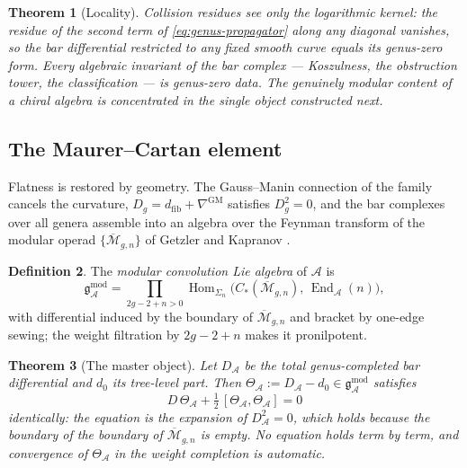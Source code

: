 \documentclass[11pt]{amsart}
\numberwithin{equation}{section}
\theoremstyle{plain}
\newtheorem{theorem}{Theorem}[section]
\theoremstyle{definition}
\newtheorem{definition}[theorem]{Definition}
\theoremstyle{remark}
\newcommand{\cA}{\mathcal{A}}
\newcommand{\cM}{\mathcal{M}}
\newcommand{\gmod}{\mathfrak{g}^{\mathrm{mod}}}
\newcommand{\Dfib}{d_{\mathrm{fib}}}
\newcommand{\Mbar}{\overline{\cM}}
\begin{document}
\begin{theorem}[Locality]\label{thm:locality}
Collision residues see only the logarithmic kernel: the residue of the
second term of \eqref{eq:genus-propagator} along any diagonal vanishes,
so the bar differential restricted to any fixed smooth curve equals its
genus-zero form. Every algebraic invariant of the bar complex ---
Koszulness, the obstruction tower, the classification --- is genus-zero
data. The genuinely modular content of a chiral algebra is concentrated
in the single object constructed next.
\end{theorem}

\subsection{The Maurer--Cartan element}

Flatness is restored by geometry. The Gauss--Manin connection of the
family cancels the curvature, $D_g=\Dfib+\nabla^{\mathrm{GM}}$ satisfies
$D_g^{2}=0$, and the bar complexes over all genera assemble into an
algebra over the Feynman transform of the modular operad
$\{\Mbar_{g,n}\}$ of Getzler and Kapranov \cite{GK}.

\begin{definition}
The \emph{modular convolution Lie algebra} of $\cA$ is
\begin{equation}
\gmod_{\cA}
=\prod_{2g-2+n>0}
\operatorname{Hom}_{\Sigma_n}\!\bigl(C_{*}(\Mbar_{g,n}),\,
\operatorname{End}_{\cA}(n)\bigr),
\end{equation}
with differential induced by the boundary of $\Mbar_{g,n}$ and bracket by
one-edge sewing; the weight filtration by $2g-2+n$ makes it pronilpotent.
\end{definition}

\begin{theorem}[The master object]\label{thm:mc}
Let $D_{\cA}$ be the total genus-completed bar differential and $d_0$ its
tree-level part. Then $\Theta_{\cA}:=D_{\cA}-d_0\in\gmod_{\cA}$ satisfies
\begin{equation}\label{eq:MC}
D\,\Theta_{\cA}+\tfrac12\,[\Theta_{\cA},\Theta_{\cA}]=0
\end{equation}
identically: the equation is the expansion of $D_{\cA}^{2}=0$, which holds
because the boundary of the boundary of $\Mbar_{g,n}$ is empty. No
equation holds term by term, and convergence
of $\Theta_{\cA}$ in the weight completion is automatic.
\end{theorem}
\end{document}
